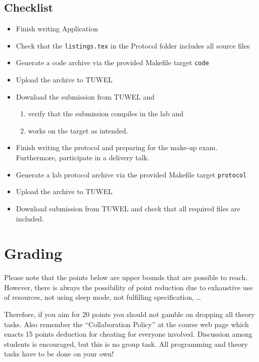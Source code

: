 \documentclass[a4paper,10pt]{article}
\begin{document}
\subsection{Checklist}

\begin{itemize}
	\item Finish writing Application
	\item Check that the \texttt{listings.tex} in the Protocol folder includes
		all source files
	\item Generate a code archive via the provided Makefile target
		\texttt{code}
	\item Upload the archive to TUWEL
	\item Download the submission from TUWEL and
		\begin{enumerate}
			\item verify that the submission compiles in the lab and
			\item works on the target as intended.
		\end{enumerate}
	\item Finish writing the protocol and preparing for the make-up exam.
		Furthermore, participate in a delivery talk.
	\item Generate a lab protocol archive via the provided Makefile target
		\texttt{protocol}
	\item Upload the archive to TUWEL
	\item Download submission from TUWEL and check that all required files are
		included.
\end{itemize}

\section{Grading}\label{sec:grading}

Please note that the points below are upper bounds that are possible to reach.
However, there is always the possibility of point reduction due to exhaustive
	use of resources, not using sleep mode, not fulfilling specification,
	\dots

Therefore, if you aim for 20 points you should not gamble on dropping all
theory tasks.
Also remember the ``Collaboration Policy'' at the course web page which enacts
15 points deduction for cheating for everyone involved.
Discussion among students is encouraged, but this is no group task.
All programming and theory tasks have to be done on your own!

\vspace{10mm}
\end{document}
